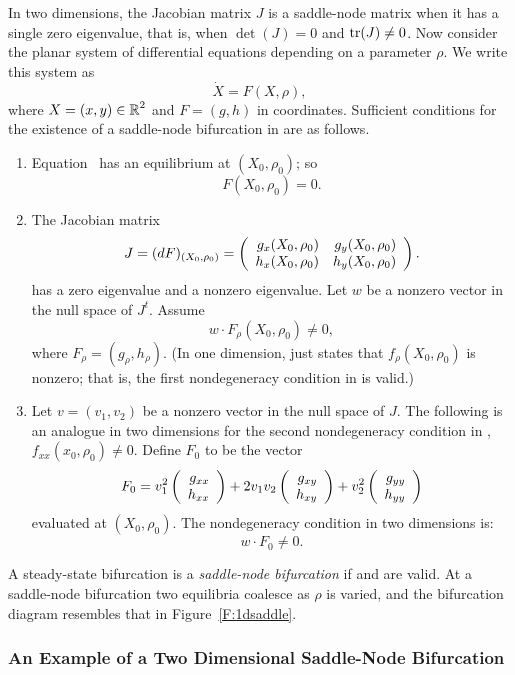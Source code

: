 \documentclass{ximera}
\begin{document}
In two dimensions, the Jacobian matrix $J$ is a saddle-node matrix when
it has a single zero eigenvalue, that is, when $\det(J)=0$ and 
${\rm tr}(J)\neq 0$.  Now consider the planar system of differential equations 
depending on a parameter $\rho$.  We write this system as
\begin{equation}  \label{e:2deqn}
\dot{X} = F(X,\rho),
\end{equation}
where $X=(x,y)\in\mbox{$\Bbb{R}$}^2$ and $F=(g,h)$ in coordinates.  Sufficient conditions
for the existence of a saddle-node bifurcation in  are as follows.
\begin{enumerate}
\item Equation~ has an equilibrium at $(X_0,\rho_0)$; so 
\[
F(X_0,\rho_0) = 0.
\]
\item  The Jacobian matrix 
\[
J=(dF)_{(X_0,\rho_0)}=
\left(\begin{array}{rr} g_x(X_0,\rho_0) & g_y(X_0,\rho_0)\\ h_x(X_0,\rho_0) &h_y(X_0,\rho_0)\end{array}\right).
\]
has a zero eigenvalue and a nonzero eigenvalue.  Let $w$ be a nonzero vector 
in the null space of $J^t$.  Assume
\begin{equation}  \label{e:2deig}
w \cdot F_\rho(X_0,\rho_0) \neq 0,
\end{equation}
where $F_\rho=(g_\rho,h_\rho)$.  (In one dimension,  just states 
that $f_\rho(X_0,\rho_0)$ is nonzero; that is, the first
nondegeneracy condition in 
 is valid.) 
\item   Let $v=(v_1,v_2)$ be a nonzero vector in the null space of $J$.
The following is an analogue in two dimensions for the second nondegeneracy
condition in , $f_{xx}(x_0,\rho_0)\neq 0$. Define $F_0$ to 
be the vector
\[
F_0 = v_1^2\left(\begin{array}{r} g_{xx} \\ h_{xx}\end{array}\right) + 2v_1v_2\left(\begin{array}{r} g_{xy} \\ h_{xy}\end{array}\right)
+ v_2^2 \left(\begin{array}{r} g_{yy} \\ h_{yy}\end{array}\right)  
\]
evaluated at $(X_0,\rho_0)$.  The nondegeneracy condition in two dimensions
is:
\begin{equation}  \label{e:2dbifur}
w \cdot F_0 \neq 0.
\end{equation}
\end{enumerate}
A steady-state bifurcation is a {\em saddle-node bifurcation\/} if 
 and  are valid.  At a saddle-node bifurcation 
two equilibria coalesce as $\rho$ is varied, and the bifurcation diagram 
resembles that in Figure~\ref{F:1dsaddle}.

\subsubsection*{An Example of a Two Dimensional Saddle-Node Bifurcation}
\end{document}
